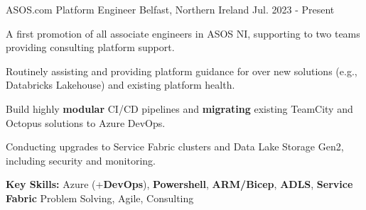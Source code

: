 
\begin{cventries}

  \cventry
  	{ASOS.com} %
    {Platform Engineer} %
    {Belfast, Northern Ireland} %
    {Jul. 2023 - Present} %
    {
    \begin{cvitems}
		\item {A first promotion of all associate engineers in ASOS NI, supporting to two teams providing consulting platform support.}
		\item {Routinely assisting and providing platform guidance for over new solutions (e.g., Databricks Lakehouse) and existing platform health.}
		\item {Build highly \textbf{modular} CI/CD pipelines and \textbf{migrating} existing TeamCity and Octopus solutions to Azure DevOps.}
    \item {Conducting upgrades to Service Fabric clusters and Data Lake Storage Gen2, including security and monitoring.}
      \item {\textbf{Key Skills:} Azure (+\textbf{DevOps}), \textbf{Powershell}, \textbf{ARM/Bicep}, \textbf{ADLS}, \textbf{Service Fabric} Problem Solving, Agile, Consulting}
     \end{cvitems}
    }


\end{cventries}
